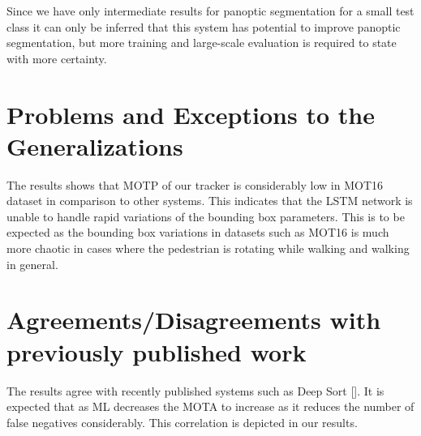 Since we have only intermediate results for panoptic segmentation for a small test class it can only be inferred that this system has potential to improve panoptic segmentation, but more training and large-scale evaluation is required to state with more certainty.

\section{Problems and Exceptions to the Generalizations}
The results shows that MOTP of our tracker is considerably low in MOT16 dataset in comparison to other systems. This indicates that the LSTM network is unable to handle rapid variations of the bounding box parameters. This is to be expected as the bounding box variations in datasets such as MOT16 is much more chaotic in cases where the pedestrian is rotating while walking and walking in general.

\section{Agreements/Disagreements with previously published work}
The results agree with recently published systems such as Deep Sort []. It is expected that as ML decreases the MOTA to increase as it reduces the number of false negatives considerably. This correlation is depicted in our results.
